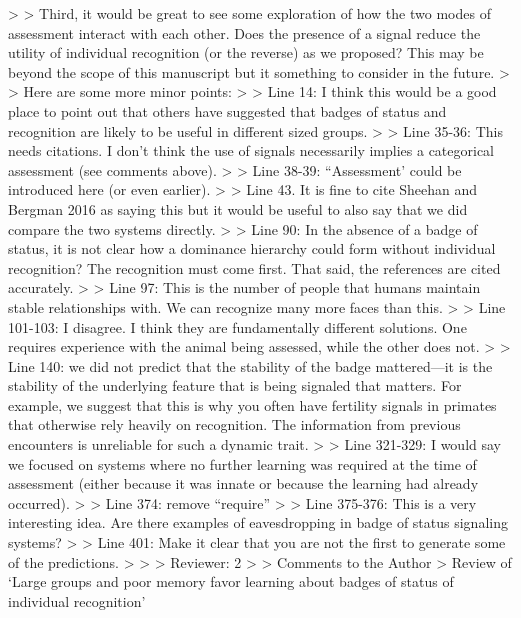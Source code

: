 >
> Third, it would be great to see some exploration of how the two modes of assessment interact with each other. Does the presence of a signal reduce the utility of individual recognition (or the reverse) as we proposed? This may be beyond the scope of this manuscript but it something to consider in the future.
>
> Here are some more minor points:
>
> Line 14: I think this would be a good place to point out that others have suggested that badges of status and recognition are likely to be useful in different sized groups.  
>
> Line 35-36: This needs citations. I don’t think the use of signals necessarily implies a categorical assessment (see comments above).
>
> Line 38-39: “Assessment’ could be introduced here (or even earlier).
>
> Line 43. It is fine to cite Sheehan and Bergman 2016 as saying this but it would be useful to also say that we did compare the two systems directly.
>
> Line 90: In the absence of a badge of status, it is not clear how a dominance hierarchy could form without individual recognition? The recognition must come first. That said, the references are cited accurately.
>
> Line 97: This is the number of people that humans maintain stable relationships with. We can recognize many more faces than this.
>
> Line 101-103: I disagree. I think they are fundamentally different solutions. One requires experience with the animal being assessed, while the other does not.
>
> Line 140: we did not predict that the stability of the badge mattered—it is the stability of the underlying feature that is being signaled that matters. For example, we suggest that this is why you often have fertility signals in primates that otherwise rely heavily on recognition. The information from previous encounters is unreliable for such a dynamic trait.
>
> Line 321-329: I would say we focused on systems where no further learning was required at the time of assessment (either because it was innate or because the learning had already occurred).
>
> Line 374: remove “require”
>
> Line 375-376: This is a very interesting idea. Are there examples of eavesdropping in badge of status signaling systems?
>
> Line 401: Make it clear that you are not the first to generate some of the predictions.
>
>
> Reviewer: 2
>
> Comments to the Author
> Review of ‘Large groups and poor memory favor learning about badges of status of individual recognition’
